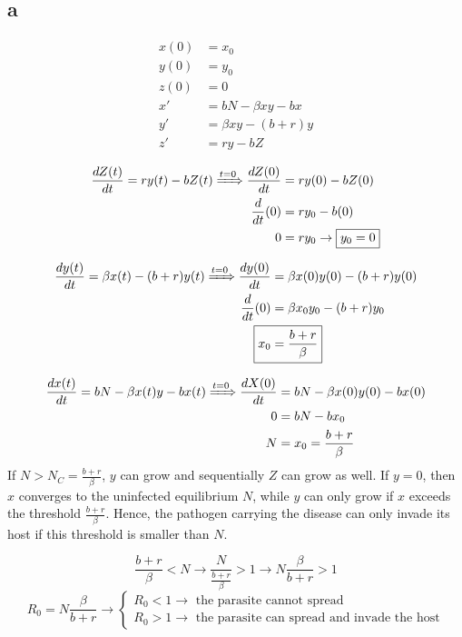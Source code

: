 \subsection{a}
\begin{align*}
x(0) &= x_0 \\
y(0) &= y_0 \\
z(0) &= 0 \\
x' &= bN - \beta xy - bx\\
y' &= \beta xy - (b+r)y \\
z' &= ry - bZ
\end{align*}

\begin{align*}
\frac{dZ(t)}{dt} = ry(t) - bZ(t) \xRightarrow{t=0} \frac{dZ(0)}{dt} &= ry(0) - bZ(0) \\
\frac{d}{dt}(0) &= ry_0 -b(0) \\ 
0 &= ry_0 \rightarrow \boxed{ y_0 = 0}
\end{align*}

\begin{align*}
\frac{dy(t)}{dt} = \beta x(t) - (b+r)y(t) \xRightarrow{t=0} \frac{dy(0)}{dt} &= \beta x(0)y(0) - (b+r)y(0) \\
\frac{d}{dt}(0) &= \beta x_0 y_0 -(b+r)y_0  \\ 
\Aboxed{ x_0 &= \frac{b+r}{\beta}}
\end{align*}


\begin{align*}
\frac{dx(t)}{dt} = bN - \beta x(t)y - bx(t) \xRightarrow{t=0} \frac{dX(0)}{dt} &= bN - \beta x(0)y(0) - bx(0)\\
0 &= bN - bx_0  \\ 
N &= x_0 = \frac{b+r}{\beta}
\end{align*}
If $N>N_C = \frac{b+r}{\beta}$, $y$ can grow and sequentially $Z$ can grow as well.
If $y = 0$, then $x$ converges to the uninfected equilibrium $N$, while $y$ can only grow if $x$ exceeds the threshold $\frac{b+r}{\beta}$. Hence, the pathogen carrying the disease can only invade its host if this threshold is smaller than $N$. 

\[ \frac{b+r}{\beta} < N \rightarrow \frac{N}{\frac{b+r}{\beta}} > 1 \rightarrow N\frac{\beta}{b + r} > 1\]
\[ R_0 = N\frac{\beta}{b + r} \rightarrow \begin{cases} 
																	R_0 < 1 \rightarrow \text{ the parasite cannot spread}  \\
																	R_0 > 1 \rightarrow \text{ the parasite can spread and invade the host} \end{cases} \]

